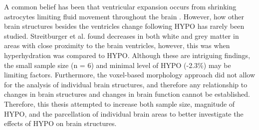 A common belief has been that ventricular expansion occurs from shrinking astrocytes limiting fluid movement throughout the brain \cite{kempton_dehydration_2011}. However, how other brain structures besides the ventricles change following HYPO has rarely been studied. Streitburger et al. \cite{streitburger_investigating_2012} found decreases in both white and grey matter in areas with close proximity to the brain ventricles, however, this was when hyperhydration was compared to HYPO. Although these are intriguing findings, the small sample size (n = 6) and minimal level of HYPO (-2.3\%) may be limiting factors. Furthermore, the voxel-based morphology approach did not allow for the analysis of individual brain structures, and therefore any relationship to changes in brain structures and changes in brain function cannot be established. Therefore, this thesis attempted to increase both sample size, magnitude of HYPO, and the parcellation of individual brain areas to better investigate the effects of HYPO on brain structures. 

